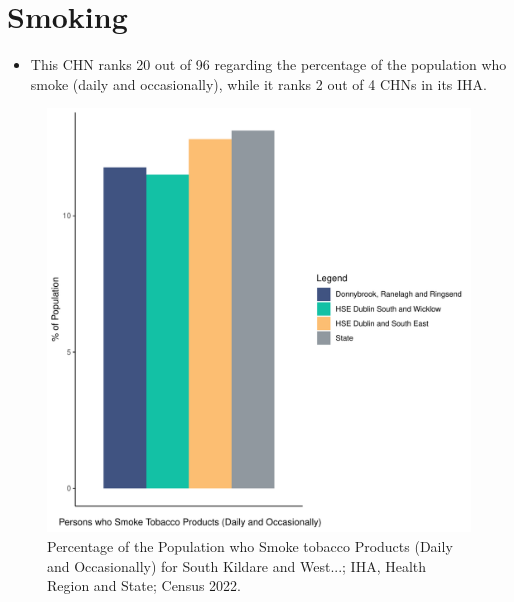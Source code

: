 \documentclass{article}
\begin{document}
\pagebreak

\section{Smoking}\label{sect:Smoking}
\begin{itemize}
\item This CHN ranks  20 out of 96 regarding the percentage of the population who smoke (daily and occasionally), while it ranks   2 out of 4 CHNs in its IHA.
\end{itemize}
\begin{figure}[H]
	\centering
	\includegraphics[width = 120mm]{../figures/SmokingED.pdf}
	\caption{Percentage of the Population who Smoke tobacco Products (Daily and Occasionally) for South Kildare and West...; IHA, Health Region and State; Census 2022.}
	\label{fig:2ae19629-1a6a-13a3-e055-000000000001}
	\end{figure}
	
\end{document}
